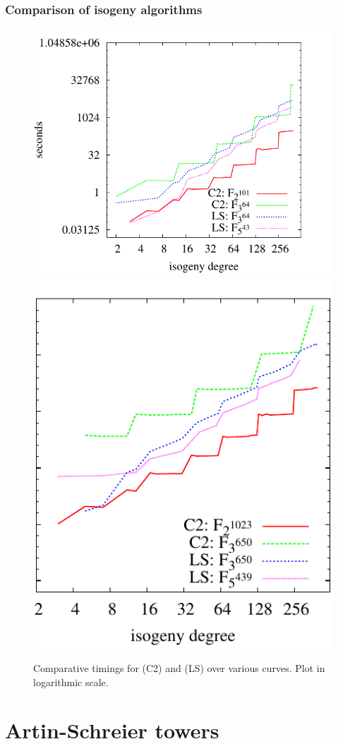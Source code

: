 \documentclass[10pt,usepdftitle=false]{beamer}
\begin{document}
\begin{frame}
  \frametitle{Comparison of isogeny algorithms}
  
  \begin{figure}
    \centering
    \includegraphics[height=0.5\textwidth]{../isogeny/C2-LS}
    \includegraphics[height=0.5\textwidth]{../isogeny/C2-LS2}
    \caption{Comparative timings for \cite{couveignes96} (C2) and
      \cite{lercier+sirvent08} (LS) over various curves. Plot in
      logarithmic scale.}
  \label{fig:comp}
\end{figure}
\end{frame}


\section{Artin-Schreier towers}
\end{document}
